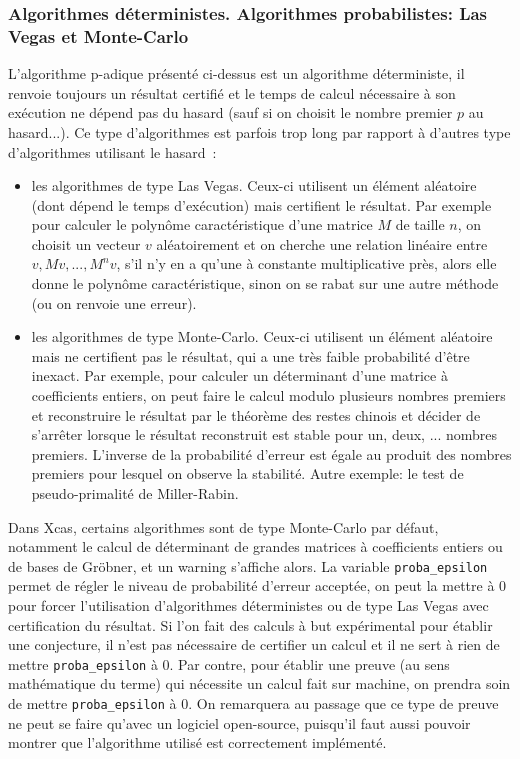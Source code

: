 \documentclass[a4paper,11pt]{article}
\begin{document}
\subsubsection{Algorithmes d\'eterministes. Algorithmes probabilistes: Las Vegas
et Monte-Carlo}
L'algorithme p-adique pr\'esent\'e ci-dessus est un algorithme
d\'eterministe, il renvoie toujours un r\'esultat certifi\'e et 
le temps de calcul n\'ecessaire \`a son ex\'ecution ne d\'epend
pas du hasard (sauf si on choisit le nombre premier $p$ au hasard...).
Ce type d'algorithmes est parfois trop long par rapport 
\`a d'autres type d'algorithmes utilisant le hasard~:
\begin{itemize}
\item les algorithmes de type Las Vegas. Ceux-ci utilisent un 
\'el\'ement al\'eatoire (dont d\'epend le temps d'ex\'ecution) mais
certifient le r\'esultat. Par exemple pour calculer le polyn\^ome
caract\'eristique d'une matrice $M$ de taille $n$, on choisit 
un vecteur $v$ al\'eatoirement
et on cherche une relation lin\'eaire entre $v,Mv,...,M^nv$,
s'il n'y en a qu'une \`a constante multiplicative pr\`es, alors
elle donne le polyn\^ome caract\'eristique, sinon on se rabat
sur une autre m\'ethode (ou on renvoie une erreur).
\item les algorithmes de type Monte-Carlo. Ceux-ci utilisent un
\'el\'ement al\'eatoire mais ne certifient pas le r\'esultat, qui a
une tr\`es faible probabilit\'e d'\^etre inexact. Par exemple,
pour calculer un d\'eterminant d'une matrice \`a coefficients
entiers, on peut faire le calcul modulo plusieurs nombres
premiers et reconstruire le r\'esultat par le th\'eor\`eme
des restes chinois et d\'ecider de s'arr\^eter lorsque
le r\'esultat reconstruit est stable pour un, deux, ... nombres
premiers. L'inverse de la probabilit\'e d'erreur est \'egale
au produit des nombres premiers pour lesquel on observe la
stabilit\'e. Autre exemple: le test de pseudo-primalit\'e
de Miller-Rabin.
\end{itemize}
Dans Xcas, certains algorithmes sont de type Monte-Carlo par
d\'efaut, notamment le calcul de d\'eterminant de grandes matrices
\`a coefficients entiers ou de bases de Gr\"obner, et un warning
s'affiche alors. La variable
\verb|proba_epsilon| permet de r\'egler le niveau de probabilit\'e
d'erreur accept\'ee, on peut la mettre \`a 0 pour forcer l'utilisation
d'algorithmes d\'eterministes ou de type Las Vegas avec certification
du r\'esultat. Si l'on fait des calculs \`a but exp\'erimental pour
\'etablir une conjecture, il n'est pas n\'ecessaire de certifier un
calcul et il ne sert \`a rien de mettre \verb|proba_epsilon| \`a 0.
Par contre, pour \'etablir une preuve (au sens math\'ematique du terme) qui
n\'ecessite un calcul fait sur machine,
on prendra soin de mettre \verb|proba_epsilon| \`a 0. 
On remarquera au passage que ce type de
preuve ne peut se faire qu'avec un logiciel open-source, puisqu'il
faut aussi pouvoir montrer que l'algorithme utilis\'e
est correctement impl\'ement\'e.
\end{document}
